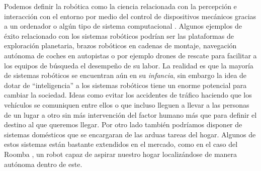 Podemos definir la robótica como la ciencia relacionada con la percepción e interacción con el entorno por medio del control de dispositivos mecánicos gracias a un ordenador o algún tipo de sistema computacional \cite{thrun_probabilistic_2005}. Algunos ejemplos de éxito relacionado con los sistemas robóticos podrían ser las plataformas de exploración planetaria, brazos robóticos en cadenas de montaje, navegación autónoma de coches en autopistas o por ejemplo drones de rescate para facilitar a los equipos de búsqueda el desempeño de su labor.
%
%
%
%
%
%
La realidad es que la mayoría de sistemas robóticos se encuentran aún en su \emph{infancia}, sin embargo la idea de dotar de  ``inteligencia'' a los sistemas robóticos tiene un enorme potencial para cambiar la sociedad. Ideas como evitar los accidentes de tráfico haciendo que los vehículos se comuniquen entre ellos o que incluso lleguen a llevar a las personas de un lugar a otro sin más intervención del factor humano más que para definir el destino al que queremos llegar. Por otro lado también podríamos disponer de sistemas domésticos que se encargaran de las arduas tareas del hogar. Algunos de estos sistemas están bastante extendidos en el mercado, como en el caso del Roomba , un robot capaz de aspirar nuestro hogar localizándose de manera autónoma dentro de este.
%
%
%
%
%
%
%
%
%
%
%
%


